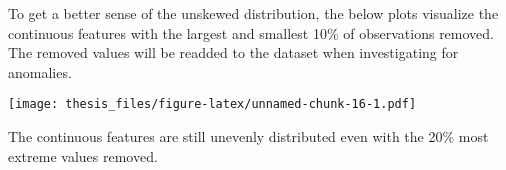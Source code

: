 \documentclass[12pt,twoside]{dukestatscithesis}
\theoremstyle{definition}
\theoremstyle{definition}
\theoremstyle{definition}
\theoremstyle{remark}
\begin{document}
To get a better sense of the unskewed distribution, the below plots
visualize the continuous features with the largest and smallest 10\% of
observations removed. The removed values will be readded to the dataset
when investigating for anomalies.
\begin{Shaded}
\begin{Highlighting}[]
\StringTok{ }
   \NormalTok{(v[}\StringTok{ }\StringTok{ }\StringTok{ }\NormalTok{(v,upperbound)])}
\NormalTok{\}}
\StringTok{ }\NormalTok{,}\NormalTok{)}
\StringTok{ }\NormalTok{,}\NormalTok{)}
\StringTok{ }\NormalTok{,}\NormalTok{)}
\StringTok{ }\NormalTok{,}\NormalTok{)}
\NormalTok{(}\NormalTok{(}\NormalTok{,}\NormalTok{))}
\end{Highlighting}
\end{Shaded}
\texttt{[image: thesis\_files/figure-latex/unnamed-chunk-16-1.pdf]}

The continuous features are still unevenly distributed even with the
20\% most extreme values removed.
\end{document}
